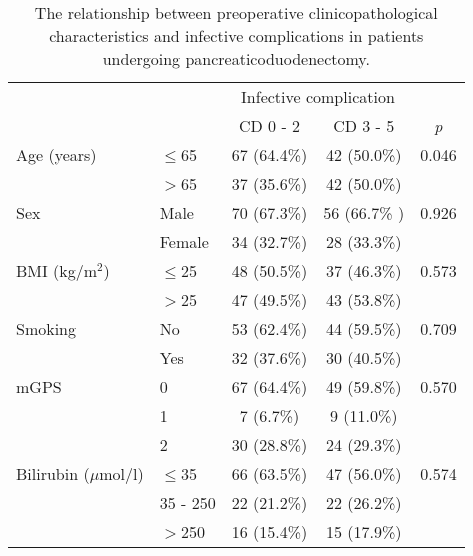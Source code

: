\begin{table}[p]
	\centering
	\caption{The relationship between preoperative clinicopathological characteristics and infective complications in patients undergoing pancreaticoduodenectomy.}
	\label{table:crp_comp_preop_factors}
	\renewcommand{\arraystretch}{1.5} %
	\setlength{\tabcolsep}{12pt} %
	\begin{tabular}{|l l c c c|}
		\hline
		                       &          & \multicolumn{2}{c}{Infective complication} &  \\
		                       &          & CD 0 - 2    & CD 3 - 5                     & \textit{p} \\ \hline
		Age (years)            & $\leq$65 & 67 (64.4\%) & 42 (50.0\%)                  & 0.046      \\
		                       & $>$65    & 37 (35.6\%) & 42 (50.0\%)                  &  \\
		Sex                    & Male     & 70 (67.3\%) & 56 (66.7\% )                 & 0.926      \\
		                       & Female   & 34 (32.7\%) & 28 (33.3\%)                  &  \\
		BMI (kg/m$^2$)      & $\leq$25 & 48 (50.5\%) & 37 (46.3\%)                  & 0.573      \\
		                       & $>$25    & 47 (49.5\%) & 43 (53.8\%)                  &  \\
		Smoking                & No       & 53 (62.4\%) & 44 (59.5\%)                  & 0.709      \\
		                       & Yes      & 32 (37.6\%) & 30 (40.5\%)                  &  \\
		mGPS                   & 0        & 67 (64.4\%) & 49 (59.8\%)                  & 0.570      \\
		                       & 1        & 7 (6.7\%)   & 9 (11.0\%)                   &  \\
		                       & 2        & 30 (28.8\%) & 24 (29.3\%)                  &  \\
		Bilirubin ($\mu$mol/l) & $\leq$35 & 66 (63.5\%) & 47 (56.0\%)                  & 0.574      \\
		                       & 35 - 250 & 22 (21.2\%) & 22 (26.2\%)                  &  \\
		                       & $>$250   & 16 (15.4\%) & 15 (17.9\%)                  &  \\

\end{tabular}
\end{table}
